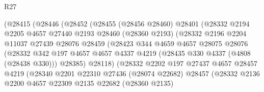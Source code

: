 \begin{lexlean}{R27}
\begin{coremodule}
                        (@28415
                          (@28446
                            (@28452
                              (@28455
                                (@28456 @28460)
                                @28401
                                (@28332
                                  @2194
                                  @2205
                                  @4657
                                  @27440
                                  @2193
                                  @28460
                                  (@28360 @2193)
                                  (@28332
                                    @2196
                                    @2204
                                    @11037
                                    @27439
                                    @28076
                                    @28459
                                    (@28423
                                      @344
                                      @4659
                                      @4657
                                      @28075
                                      @28076
                                      (@28332
                                        @342
                                        @197
                                        @4657
                                        @4657
                                        @4337
                                        @4219
                                        (@28435 @330 @4337 (@4808 (@28438 @330)))
                                        @28385)
                                      @28118)
                                    (@28332
                                      @2202
                                      @197
                                      @27437
                                      @4657
                                      @28457
                                      @4219
                                      (@28340
                                        @2201
                                        @22310
                                        @27436
                                        (@28074 @22682)
                                        @28457
                                        (@28332
                                          @2136
                                          @2200
                                          @4657
                                          @22309
                                          @2135
                                          @22682
                                          (@28360 @2135)

\end{coremodule}
\end{lexlean}
